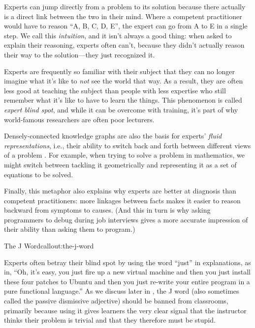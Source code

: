 \begin{genumerate}

\item
  Experts can jump directly from a problem to its solution because
  there actually is a direct link between the two in their mind.
  Where a competent practitioner would have to reason ``A, B, C, D,
  E'', the expert can go from A to E in a single step. We call
  this \emph{intuition}, and it isn't always a good thing: when asked
  to explain their reasoning, experts often can't, because they didn't
  actually reason their way to the solution---they just recognized it.

\item
  Experts are frequently so familiar with their subject that they can
  no longer imagine what it's like to \emph{not} see the world that
  way. As a result, they are often less good at teaching the subject
  than people with less expertise who still remember what it's like to
  have to learn the things. This phenomenon is called \emph{expert
  blind spot}, and while it can be overcome with training, it's part
  of why world-famous researchers are often poor lecturers.

\item
  Densely-connected knowledge graphs are also the basis for
  experts' \emph{fluid representations}, i.e., their ability to switch
  back and forth between different views of a problem
  \cite{bib:petre-expertise}.  For example, when trying to solve a
  problem in mathematics, we might switch between tackling it
  geometrically and representing it as a set of equations to be
  solved.

\item
  Finally, this metaphor also explains why experts are better at
  diagnosis than competent practitioners: more linkages between facts
  makes it easier to reason backward from symptoms to causes. (And
  this in turn is why asking programmers to debug during job
  interviews gives a more accurate impression of their ability than
  asking them to program.)

\end{genumerate}

\begin{callout}{The J Word}{callout:the-j-word}

Experts often betray their blind spot by using the word ``just'' in
explanations, as in, ``Oh, it's easy, you just fire up a new virtual
machine and then you just install these four patches to Ubuntu and
then you just re-write your entire program in a pure functional
language.'' As we discuss later in , the J word
(also sometimes called the passive dismissive adjective) should be
banned from classrooms, primarily because using it gives learners the
very clear signal that the instructor thinks their problem is trivial
and that they therefore must be stupid.

\end{callout}

